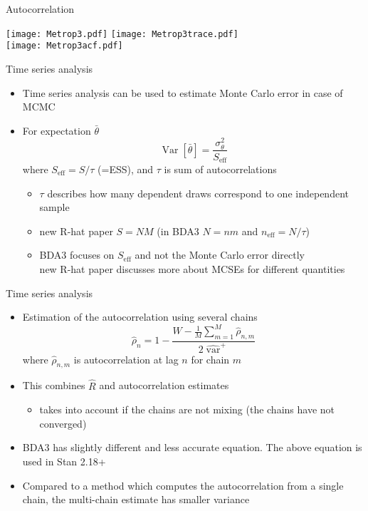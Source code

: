 \documentclass[finnish,english,t]{beamer}
\def\eff{\text{eff}}
\DeclareMathOperator{\Var}{Var}
\DeclareMathOperator{\var}{var}
\begin{document}
\begin{frame}{Autocorrelation}

  \vspace{-0.5\baselineskip}
  \texttt{[image: Metrop3.pdf]}
  {\texttt{[image: Metrop3trace.pdf]}\\}
  {\texttt{[image: Metrop3acf.pdf]}}
  
\end{frame}

\begin{frame}{Time series analysis}

  \begin{itemize}
  \item Time series analysis can be used to estimate Monte Carlo
    error in case of MCMC
  \item For expectation $\bar{\theta}$
    \begin{equation*}
      \Var[\bar{\theta}] = \frac{\sigma^2_\theta}{S_\eff}
    \end{equation*}
    where $S_\eff=S/\tau$ (=ESS), and $\tau$ is sum of autocorrelations
    \begin{itemize}
      \item<2-> $\tau$ describes how many dependent draws correspond to one independent sample
      \item<3-> new R-hat paper $S=NM$ (in BDA3 $N=nm$ and $n_\eff=N/\tau$)
      \item<4-> BDA3 focuses on $S_\eff$ and not the Monte Carlo error directly\\
        new R-hat paper discusses more about MCSEs for different quantities
    \end{itemize}
  \end{itemize}  
\end{frame}

\begin{frame}{Time series analysis}

  \begin{itemize}
  \item Estimation of the autocorrelation using several chains
    \begin{equation*}
      \hat{\rho}_n=1-\frac{W - \frac{1}{M}\sum_{m=1}^M \hat{\rho}_{n,m}}{2\widehat{\var}^{+}}
    \end{equation*}
    where $\hat{\rho}_{n,m}$ is autocorrelation at lag $n$ for chain $m$
  \item<2-> This combines $\widehat{R}$ and autocorrelation estimates
    \begin{itemize}
    \item takes into account if the chains are not mixing (the chains have not converged)
    \end{itemize}
  \item<3-> BDA3 has slightly different and less accurate equation. The
    above equation is used in Stan 2.18+
  \item<4-> Compared to a method which computes the autocorrelation
    from a single chain, the multi-chain estimate has smaller variance
 \end{itemize}
\end{frame}
\end{document}
